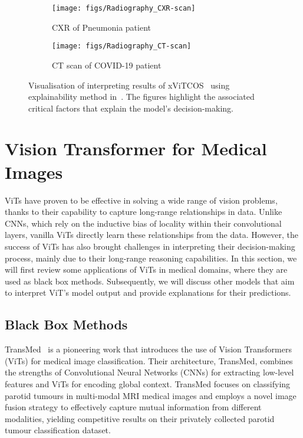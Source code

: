\documentclass[dvipsnames]{article}
\renewcommand{\cite}[1]{\autocite{#1}}
\begin{document}
\begin{figure}[t]
	\centering
    \begin{subfigure}[t]{.495\linewidth}
        \texttt{[image: figs/Radiography\_CXR-scan]}
        \caption{
            CXR of Pneumonia patient
        }
    \end{subfigure}\hfill%
    \begin{subfigure}[t]{.495\linewidth}
        \texttt{[image: figs/Radiography\_CT-scan]}
        \caption{
            CT scan of COVID-19 patient
        }
    \end{subfigure}
	\caption{\label{fig:covid19-pred}
        Visualisation of interpreting results of xViTCOS~\cite{mondal2021xvitcos} using explainability method in~\cite{chefer2021transformer}.
        The figures highlight the associated critical factors that explain the model's decision-making.
    }
\end{figure}





\section{Vision Transformer for Medical Images}

ViTs have proven to be effective in solving a wide range of vision problems, thanks to their capability to capture long-range relationships in data. Unlike CNNs, which rely on the inductive bias of locality within their convolutional layers, vanilla ViTs directly learn these relationships from the data.
However, the success of ViTs has also brought challenges in interpreting their decision-making process, mainly due to their long-range reasoning capabilities.
In this section, we will first review some applications of ViTs in medical domains, where they are used as black box methods.
Subsequently, we will discuss other models that aim to interpret ViT's model output and provide explanations for their predictions.


\subsection{Black Box Methods}

TransMed~\cite{dai2021transmed} is a pioneering work that introduces the use of Vision Transformers (ViTs) for medical image classification. Their architecture, TransMed, combines the strengths of Convolutional Neural Networks (CNNs) for extracting low-level features and ViTs for encoding global context. TransMed focuses on classifying parotid tumours in multi-modal MRI medical images and employs a novel image fusion strategy to effectively capture mutual information from different modalities, yielding competitive results on their privately collected parotid tumour classification dataset.
\end{document}
